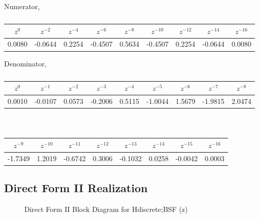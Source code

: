 \documentclass[12pt]{article}
\begin{document}
Numerator,
\begin{table}[H]
\centering  %
\begin{tabular}{|c|c|c|c|c|c|c|c|c|}
\hline  %
$z^{0}$ & $z^{-2}$ & $z^{-4}$ & $z^{-6}$ & $z^{-8}$ & $z^{-10}$ & $z^{-12}$ & $z^{-14}$ & $z^{-16}$\\ \hline 
0.0080 & -0.0644 & 0.2254 & -0.4507 & 0.5634  & -0.4507 & 0.2254 & -0.0644 & 0.0080 \\
\hline    %
\end{tabular}
\caption{}
\end{table}
Denominator,
\begin{table}[H]
\centering  %
\begin{tabular}{|c|c|c|c|c|c|c|c|c|}
\hline  %
$z^{0}$ & $z^{-1}$ & $z^{-2}$ & $z^{-3}$ & $z^{-4}$ & $z^{-5}$ & $z^{-6}$ & $z^{-7}$ & $z^{-8}$\\ \hline 
0.0010 & -0.0107 & 0.0573 & -0.2006 & 0.5115 & -1.0044 & 1.5679 & -1.9815 & 2.0474\\
\hline    %
\end{tabular}
\\
\centering  %
\begin{tabular}{|c|c|c|c|c|c|c|c|}
\hline  %
$z^{-9}$ & $z^{-10}$ & $z^{-11}$ & $z^{-12}$ & $z^{-13}$ & $z^{-14}$ & $z^{-15}$ & $z^{-16}$  \\ \hline 
-1.7349 & 1.2019 & -0.6742 & 0.3006 & -0.1032 & 0.0258 & -0.0042 & 0.0003 \\
\hline    %
\end{tabular}

\caption{}
\end{table}
\newpage
\subsection{Direct Form II Realization}


\begin{figure}[H]
    \caption{Direct Form II Block Diagram for Hdiscrete;BSF (z)}
\end{figure}


\newpage
\end{document}
